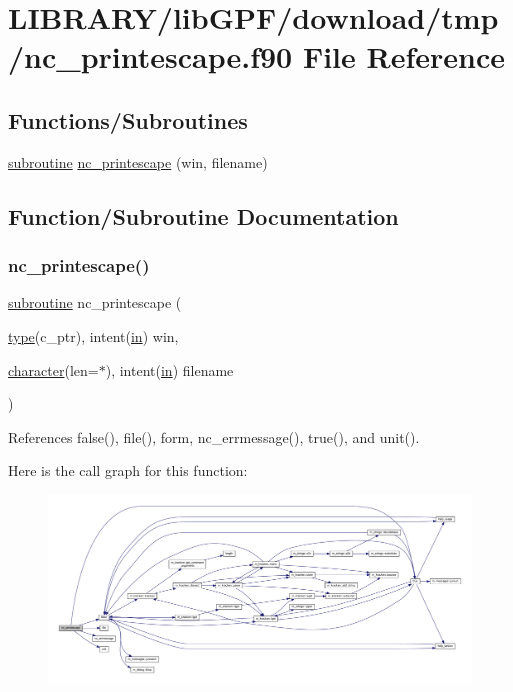 \hypertarget{nc__printescape_8f90}{}\section{L\+I\+B\+R\+A\+R\+Y/lib\+G\+P\+F/download/tmp/nc\+\_\+printescape.f90 File Reference}
\label{nc__printescape_8f90}
\subsection*{Functions/\+Subroutines}
\begin{DoxyCompactItemize}
\item 
\hyperlink{M__stopwatch_83_8txt_acfbcff50169d691ff02d4a123ed70482}{subroutine} \hyperlink{nc__printescape_8f90_a980685b54c9fb58728ac0d9a3ff837f0}{nc\+\_\+printescape} (win, filename)
\end{DoxyCompactItemize}


\subsection{Function/\+Subroutine Documentation}
\mbox{\label{nc__printescape_8f90_a980685b54c9fb58728ac0d9a3ff837f0}} 
\subsubsection{\texorpdfstring{nc\+\_\+printescape()}{nc\_printescape()}}
{\footnotesize\ttfamily \hyperlink{M__stopwatch_83_8txt_acfbcff50169d691ff02d4a123ed70482}{subroutine} nc\+\_\+printescape (\begin{DoxyParamCaption}\item[{\hyperlink{stop__watch_83_8txt_a70f0ead91c32e25323c03265aa302c1c}{type}(c\+\_\+ptr), intent(\hyperlink{M__journal_83_8txt_afce72651d1eed785a2132bee863b2f38}{in})}]{win,  }\item[{\hyperlink{option__stopwatch_83_8txt_abd4b21fbbd175834027b5224bfe97e66}{character}(len=$\ast$), intent(\hyperlink{M__journal_83_8txt_afce72651d1eed785a2132bee863b2f38}{in})}]{filename }\end{DoxyParamCaption})}



References false(), file(), form, nc\+\_\+errmessage(), true(), and unit().

Here is the call graph for this function\+:
\nopagebreak
\begin{figure}[H]
\begin{center}
\leavevmode
\includegraphics[width=350pt]{nc__printescape_8f90_a980685b54c9fb58728ac0d9a3ff837f0_cgraph}
\end{center}
\end{figure}
